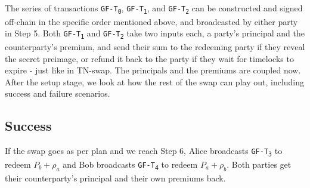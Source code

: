 The series of transactions \texttt{GF-T\textsubscript{0}}, \texttt{GF-T\textsubscript{1}}, and \texttt{GF-T\textsubscript{2}} can be constructed and signed off-chain in the specific order mentioned above, and broadcasted by either party in Step 5. Both \texttt{GF-T\textsubscript{1}} and \texttt{GF-T\textsubscript{2}} take two inputs each, a party's principal and the counterparty's premium, and send their sum to the redeeming party if they reveal the secret preimage, or refund it back to the party if they wait for timelocks to expire - just like in TN-swap. The principals and the premiums are coupled now. After the setup stage, we look at how the rest of the swap can play out, including success and failure scenarios.

\subsection{Success}
If the swap goes as per plan and we reach Step 6, Alice broadcasts \texttt{GF-T\textsubscript{3}} to redeem $P_b + \rho_a$ and Bob broadcasts \texttt{GF-T\textsubscript{4}} to redeem $P_a + \rho_b$. Both parties get their counterparty's principal and their own premiums back.

